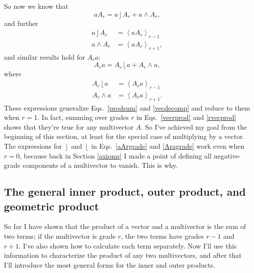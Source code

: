 \documentclass{utarticle}
\DeclareMathOperator{\lin}{\rfloor}
\DeclareMathOperator{\rin}{\lfloor}
\DeclareMathOperator{\out}{\wedge}
\newcommand{\grade}[2][]{\ensuremath{\left\langle #2 \right\rangle_{#1}}}
\begin{document}
So now we know that
\begin{equation}
aA_r = a \lin A_r + a \out A_r,
\label{vecrprod}
\end{equation}
and further
\begin{align}
a \lin A_r & = \grade[r-1]{aA_r} \nonumber \\
a \out A_r & = \grade[r+1]{aA_r},
\label{aArgrade}
\end{align}
and similar results hold for $A_ra$:  
\begin{equation}
A_ra = A_r \rin a + A_r \out a,
\label{rvecprod}
\end{equation}
where
\begin{align}
A_r \rin a & = \grade[r-1]{A_ra} \nonumber \\
A_r \out a & = \grade[r+1]{A_ra}.
\label{Aragrade}
\end{align}
These expressions generalize Eqs.~\eqref{prodsum} and \eqref{vecdecomp} and reduce
to them when $r = 1$.  In fact, summing over grades $r$ in Eqs.~\eqref{vecrprod} and 
\eqref{rvecprod} shows that they're true for any multivector $A$.  So I've achieved 
my goal from the beginning of this section, at least  for the special case of multiplying by 
a vector.  The expressions for $\lin$ and $\rin$ in Eqs.~\eqref{aArgrade} and \eqref{Aragrade} 
work even when $r=0$, because back in Section \ref{axioms} I made a point of defining 
all negative-grade components of a multivector to vanish.  This is why.

\subsection{The general inner product, outer product, and geometric product}
\label{geninnerouter}

So far I have shown that the product of a vector and a multivector is the sum 
of two terms; if the multivector is grade $r$, the two terms have grades $r-1$ 
and $r+1$. I've also shown how to calculate each term separately.  
Now I'll use this information to characterize the product of any 
two multivectors, and after that I'll introduce the most general forms for 
the inner and outer products.
\end{document}
